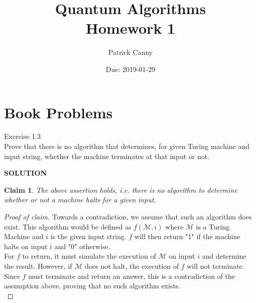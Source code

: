 \documentclass{exam} %
\newcommand{\cl}[1]{\mathcal{#1}}  %
\theoremstyle{plain}
\newtheorem{claim}[thm]{Claim}      \newtheorem*{claim*}{Claim}
\theoremstyle{definition}
\theoremstyle{remark}
\newenvironment{claimproof} {
  \begin{proof}[Proof of claim]
  \renewcommand{\qedsymbol}{\ensuremath{\bullet}}
  } {
  \end{proof}
  }
\numberwithin{equation}{section}  %
\newcommand{\sol}{\begin{center}\textbf{SOLUTION}\end{center}}
\begin{document}
\title{Quantum Algorithms \\ Homework 1}
\author{Patrick Canny}
\date{Due: 2019-01-29}
\maketitle
\section {Book Problems}
\begin{questions}
  \question Exercise 1.3\\
  Prove that there is no algorithm that determines, for given Turing machine and 
  input string, whether the machine terminates at that input or not.\\
  \sol
  \begin{claim} The above assertion holds, i.e. there is no algorithm to determine
    whether or not a machine halts for a given input.
  \end{claim}
  \begin{claimproof}
  Towards a contradiction, we assume that such an algorithm does exist. This 
  algorithm would be defined as $f(\cl{M}, i)$ where $\cl{M}$ is a Turing Machine
  and $i$ is the given input string. $f$ will then return "1" if the machine halts
  on input $i$ and "0" otherwise.\\

  For $f$ to return, it must simulate the execution of $\cl{M}$ on input $i$
  and determine the result. However, if $\cl{M}$ does not halt, the execution
  of $f$ will not terminate. Since $f$ must terminate and return an answer, 
  this is a contradiction of the assumption above, proving that no such algorithm
  exists.\\
  \end{claimproof}
\end{questions}
\end{document}
